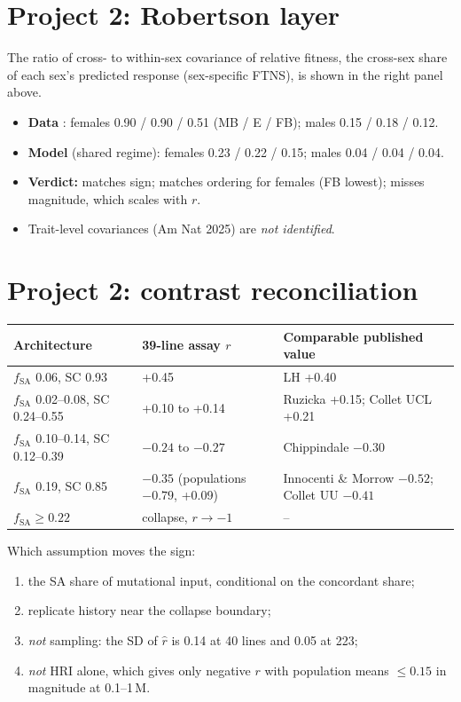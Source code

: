 \section{Project 2: Robertson layer}\label{sec:res-robertson}
The ratio of cross- to within-sex covariance of relative fitness, the cross-sex share of each sex's predicted response (sex-specific FTNS), is shown in the right panel above.
\begin{itemize}
\item \textbf{Data} \claimB: females 0.90 / 0.90 / 0.51 (MB / E / FB); males 0.15 / 0.18 / 0.12.
\item \textbf{Model} (shared regime): females 0.23 / 0.22 / 0.15; males 0.04 / 0.04 / 0.04.
\item \textbf{Verdict:} matches sign; matches ordering for females (FB lowest); misses magnitude, which scales with $r$.
\item Trait-level covariances (Am Nat 2025) are \emph{not identified}.
\end{itemize}

\section{Project 2: contrast reconciliation \claimC}
\begin{tabularx}{\textwidth}{XlX}\toprule
Architecture & 39-line assay $r$ & Comparable published value\\\midrule
$f_\mathrm{SA}$ 0.06, SC 0.93 & +0.45 & LH +0.40\\
$f_\mathrm{SA}$ 0.02--0.08, SC 0.24--0.55 & +0.10 to +0.14 & Ruzicka +0.15; Collet UCL +0.21\\
$f_\mathrm{SA}$ 0.10--0.14, SC 0.12--0.39 & $-0.24$ to $-0.27$ & Chippindale $-0.30$\\
$f_\mathrm{SA}$ 0.19, SC 0.85 & $-0.35$ (populations $-0.79$, +0.09) & Innocenti \& Morrow $-0.52$; Collet UU $-0.41$\\
$f_\mathrm{SA}\ge0.22$ & collapse, $r\to-1$ & --\\\bottomrule
\end{tabularx}

\noindent Which assumption moves the sign:
\begin{enumerate}
\item the SA share of mutational input, conditional on the concordant share;
\item replicate history near the collapse boundary;
\item \emph{not} sampling: the SD of $\hat r$ is 0.14 at 40 lines and 0.05 at 223;
\item \emph{not} HRI alone, which gives only negative $r$ with population means $\le0.15$ in magnitude at 0.1--1\,M.
\end{enumerate}


